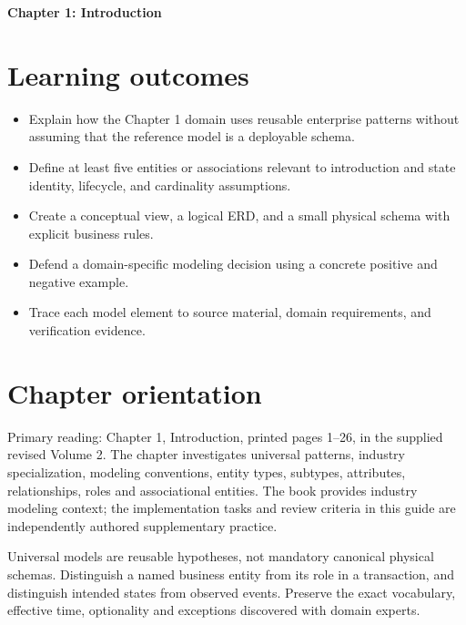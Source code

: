 \documentclass[11pt,letterpaper]{article}
\begin{document}
\begin{center}
{\LARGE\bfseries\color{navy} Chapter 1: Introduction}\par
\vspace{0.25em}{\large Study guide | concept, critique, design, verify}\par
{}
\end{center}
\vspace{0.8em}
\section{Learning outcomes}
\begin{itemize}
\item Explain how the Chapter 1 domain uses reusable enterprise patterns without assuming that the reference model is a deployable schema.
\item Define at least five entities or associations relevant to introduction and state identity, lifecycle, and cardinality assumptions.
\item Create a conceptual view, a logical ERD, and a small physical schema with explicit business rules.
\item Defend a domain-specific modeling decision using a concrete positive and negative example.
\item Trace each model element to source material, domain requirements, and verification evidence.
\end{itemize}

\section{Chapter orientation}
Primary reading: Chapter 1, Introduction, printed pages 1--26, in the supplied revised Volume 2. The chapter investigates universal patterns, industry specialization, modeling conventions, entity types, subtypes, attributes, relationships, roles and associational entities. The book provides industry modeling context; the implementation tasks and review criteria in this guide are independently authored supplementary practice.

Universal models are reusable hypotheses, not mandatory canonical physical schemas. Distinguish a named business entity from its role in a transaction, and distinguish intended states from observed events. Preserve the exact vocabulary, effective time, optionality and exceptions discovered with domain experts.
\end{document}
